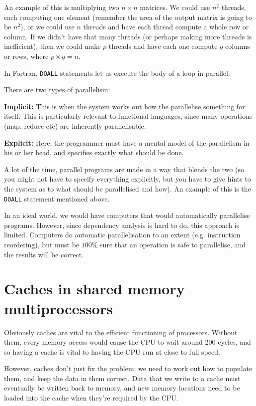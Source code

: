 An example of this is multiplying two $n\times n$ matrices. We could use $n^2$
threads, each computing one element (remember the area of the output matrix is
going to be $n^2$), or we could use $n$ threads and have each thread compute a
whole row or column. If we didn't have that many threads (or perhaps making more
threads is inefficient), then we could make $p$ threads and have each one
compute $q$ columns or rows, where $p\times q = n$.

In Fortran, \texttt{DOALL} statements let us execute the body of a loop in
parallel.

There are two types of parallelism:

\begin{description}
  \item \textbf{Implicit:} This is when the system works out how the parallelise
  something for itself. This is particularly relevant to functional languages,
  since many operations (map, reduce etc) are inherently parallelisable.
  \item \textbf{Explicit:} Here, the programmer must have a mental model of the
  parallelism in his or her head, and specifies exactly what should be done.
\end{description}

A lot of the time, parallel programs are made in a way that blends the two (so
you might not have to specify everything explicitly, but you have to give hints
to the system as to what should be parallelised and how). An example of this is
the \texttt{DOALL} statement mentioned above.

In an ideal world, we would have computers that would automatically parallelise
programs. However, since dependency analysis is hard to do, this approach is
limited. Computers do automatic parallelisation to an extent (e.g. instruction
reordering), but must be $100\%$ sure that an operation is safe to parallelise,
and the results will be correct.

\section{Caches in shared memory multiprocessors}

Obviously caches are vital to the efficient functioning of processors. Without
them, every memory access would cause the CPU to wait around 200 cycles, and so
having a cache is vital to having the CPU run at close to full speed.

However, caches don't just fix the problem; we need to work out how to populate
them, and keep the data in them correct. Data that we write to a cache must
eventually be written back to memory, and new memory locations need to be loaded
into the cache when they're required by the CPU.

